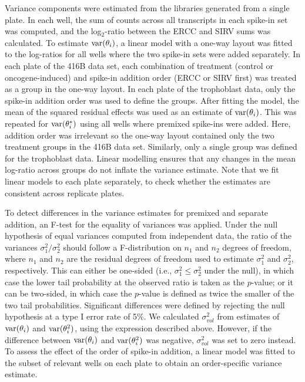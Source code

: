 \documentclass{article}
\begin{document}
Variance components were estimated from the libraries generated from a single plate.
In each well, the sum of counts across all transcripts in each spike-in set was computed, and the log$_2$-ratio between the ERCC and SIRV sums was calculated.
To estimate $\mbox{var}(\theta_i)$, a linear model with a one-way layout was fitted to the log-ratios for all wells where the two spike-in sets were added separately.
In each plate of the 416B data set, each combination of treatment (control or oncogene-induced) and spike-in addition order (ERCC or SIRV first) was treated as a group in the one-way layout.
In each plate of the trophoblast data, only the spike-in addition order was used to define the groups.
After fitting the model, the mean of the squared residual effects was used as an estimate of $\mbox{var}(\theta_i)$.
This was repeated for $\mbox{var}(\theta^*_i)$ using all wells where premixed spike-ins were added.
Here, addition order was irrelevant so the one-way layout contained only the two treatment groups in the 416B data set.
Similarly, only a single group was defined for the trophoblast data.
Linear modelling ensures that any changes in the mean log-ratio across groups do not inflate the variance estimate.
Note that we fit linear models to each plate separately, to check whether the estimates are consistent across replicate plates.

To detect differences in the variance estimates for premixed and separate addition, an F-test for the equality of variances was applied.
Under the null hypothesis of equal variances computed from independent data, the ratio of the variances $\sigma^2_1/\sigma^2_2$ should follow a F-distribution on $n_1$ and $n_2$ degrees of freedom, where $n_1$ and $n_2$ are the residual degrees of freedom used to estimate $\sigma^2_1$ and $\sigma^2_2$, respectively.
This can either be one-sided (i.e., $\sigma^2_1 \le \sigma^2_2$ under the null), in which case the lower tail probability at the observed ratio is taken as the $p$-value;
or it can be two-sided, in which case the $p$-value is defined as twice the smaller of the two tail probabilities.
Significant differences were defined by rejecting the null hypothesis at a type I error rate of 5\%.
We calculated $\sigma^2_{vol}$ from estimates of $\mbox{var}(\theta_i)$ and $\mbox{var}(\theta^2_i)$, using the expression described above.
However, if the difference between $\mbox{var}(\theta_i)$ and $\mbox{var}(\theta^2_i)$ was negative, $\sigma^2_{vol}$ was set to zero instead.
To assess the effect of the order of spike-in addition, a linear model was fitted to the subset of relevant wells on each plate to obtain an order-specific variance estimate.
\end{document}
